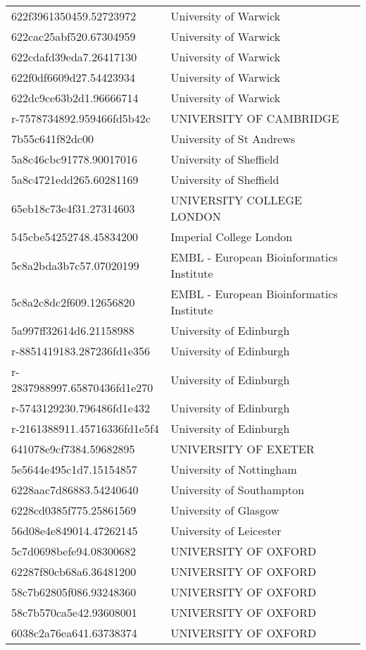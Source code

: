 \begin{tabular}{ll}
622f3961350459.52723972 & University of Warwick \\
622cac25abf520.67304959 & University of Warwick \\
622cdafd39eda7.26417130 & University of Warwick \\
622f0df6609d27.54423934 & University of Warwick \\
622dc9ce63b2d1.96666714 & University of Warwick \\
r-7578734892.959466fd5b42c & UNIVERSITY OF CAMBRIDGE \\
7b55c641f82dc00 & University of St Andrews \\
5a8c46cbc91778.90017016 & University of Sheffield \\
5a8c4721edd265.60281169 & University of Sheffield \\
65eb18c73e4f31.27314603 & UNIVERSITY COLLEGE LONDON \\
545cbe54252748.45834200 & Imperial College London \\
5c8a2bda3b7c57.07020199 & EMBL - European Bioinformatics Institute \\
5c8a2c8dc2f609.12656820 & EMBL - European Bioinformatics Institute \\
5a997ff32614d6.21158988 & University of Edinburgh \\
r-8851419183.287236fd1e356 & University of Edinburgh \\
r-2837988997.65870436fd1e270 & University of Edinburgh \\
r-5743129230.796486fd1e432 & University of Edinburgh \\
r-2161388911.45716336fd1e5f4 & University of Edinburgh \\
641078e9cf7384.59682895 & UNIVERSITY OF EXETER \\
5e5644e495c1d7.15154857 & University of Nottingham \\
6228aac7d86883.54240640 & University of Southampton \\
6228cd0385f775.25861569 & University of Glasgow \\
56d08e4e849014.47262145 & University of Leicester \\
5c7d0698befe94.08300682 & UNIVERSITY OF OXFORD \\
62287f80cb68a6.36481200 & UNIVERSITY OF OXFORD \\
58c7b62805f086.93248360 & UNIVERSITY OF OXFORD \\
58c7b570ca5e42.93608001 & UNIVERSITY OF OXFORD \\
6038c2a76ea641.63738374 & UNIVERSITY OF OXFORD \\

\end{tabular}
